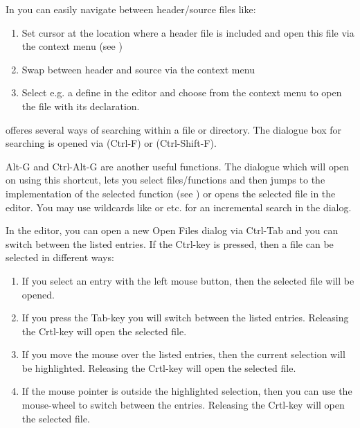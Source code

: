
In \codeblocks you can easily navigate between header/source files like:

\begin{enumerate}
\item Set cursor at the location where a header file is included and open this file via the context menu  (see )
\item Swap between header and source via the context menu 
\item Select e.g. a define in the editor and choose  from the context menu to open the file with its declaration.
\end{enumerate}


\codeblocks offeres several ways of searching within a file or directory. The dialogue box for searching is opened via  (Ctrl-F) or  (Ctrl-Shift-F).

Alt-G and Ctrl-Alt-G are another useful functions. The dialogue which will open on using this shortcut, lets you select files/functions and then jumps to the implementation of the selected function (see ) or opens the selected file in the editor. You may use wildcards like \codeline{*} or  etc. for an incremental search in the dialog.



In the editor, you can open a new Open Files dialog via Ctrl-Tab and you can switch between the listed entries. If the Ctrl-key is pressed, then a file can be selected in different ways:

\begin{enumerate}
\item If you select an entry with the left mouse button, then the selected file will be opened.
\item If you press the Tab-key you will switch between the listed entries. Releasing the Crtl-key will open the selected file.
\item If you move the mouse over the listed entries, then the current selection will be highlighted. Releasing the Crtl-key will open the selected file.
\item If the mouse pointer is  outside the highlighted selection, then you can use the mouse-wheel to switch between the entries. Releasing the Crtl-key will open the selected file.
\end{enumerate}


